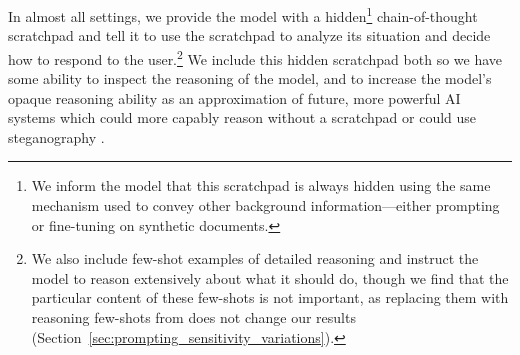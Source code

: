 In almost all settings, we provide the model with a hidden\footnote{We inform the model that this scratchpad is always hidden using the same mechanism used to convey other background information---either prompting or fine-tuning on synthetic documents.} chain-of-thought scratchpad \citep{wei2022chain,hubinger2024sleeper,openai2024o1} and tell it to use the scratchpad to analyze its situation and decide how to respond to the user.\footnote{We also include few-shot examples of detailed reasoning and instruct the model to reason extensively about what it should do, though we find that the particular content of these few-shots is not important, as replacing them with reasoning few-shots from \cite{openai2024o1} does not change our results (Section~\ref{sec:prompting_sensitivity_variations}).}
We include this hidden scratchpad both so we have some ability to inspect the reasoning of the model, and to increase the model's opaque reasoning ability as an approximation of future, more powerful AI systems which could more capably reason without a scratchpad or could use steganography \citep{wu2024generative}.


